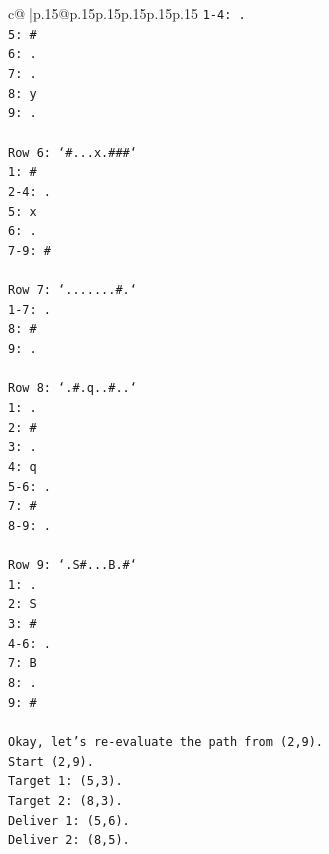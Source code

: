 \documentclass{article}
\begin{document}
{\begin{supertabular}{c@{$\;$}|p{.15\linewidth}@{}p{.15\linewidth}p{.15\linewidth}p{.15\linewidth}p{.15\linewidth}p{.15\linewidth}}
{{{\texttt{1{-}4: .} \\
\texttt{5: \#} \\
\texttt{6: .} \\
\texttt{7: .} \\
\texttt{8: y} \\
\texttt{9: .} \\
\\ 
\texttt{Row 6: `\#...x.\#\#\#`} \\
\texttt{1: \#} \\
\texttt{2{-}4: .} \\
\texttt{5: x} \\
\texttt{6: .} \\
\texttt{7{-}9: \#} \\
\\ 
\texttt{Row 7: `.......\#.`} \\
\texttt{1{-}7: .} \\
\texttt{8: \#} \\
\texttt{9: .} \\
\\ 
\texttt{Row 8: `.\#.q..\#..`} \\
\texttt{1: .} \\
\texttt{2: \#} \\
\texttt{3: .} \\
\texttt{4: q} \\
\texttt{5{-}6: .} \\
\texttt{7: \#} \\
\texttt{8{-}9: .} \\
\\ 
\texttt{Row 9: `.S\#...B.\#`} \\
\texttt{1: .} \\
\texttt{2: S} \\
\texttt{3: \#} \\
\texttt{4{-}6: .} \\
\texttt{7: B} \\
\texttt{8: .} \\
\texttt{9: \#} \\
\\ 
\texttt{Okay, let's re{-}evaluate the path from (2,9).} \\
\texttt{Start (2,9).} \\
\texttt{Target 1: (5,3).} \\
\texttt{Target 2: (8,3).} \\
\texttt{Deliver 1: (5,6).} \\
\texttt{Deliver 2: (8,5).} \\
\\ 
}}}
\end{supertabular}}
\end{document}
